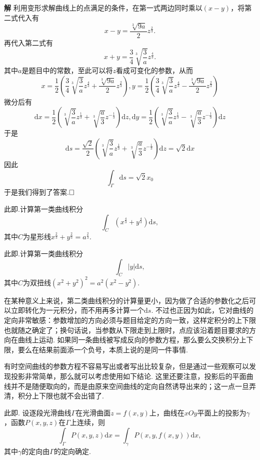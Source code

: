 \documentclass{ctexart}
\newenvironment{custom}[1]{\par\noindent \textbf{#1}\quad}{\par\vspace{1em}}
\begin{document}
\begin{custom}{解}
利用变形求解曲线上的点满足的条件，在第一式两边同时乘以$(x-y)$，将第二式代入有
$$x-y=\frac{\sqrt[3]{9a}}{2}z^{\frac{2}{3}}.$$
再代入第二式有
$$x+y=\frac{3}{4}\sqrt[3]{\frac{3}{a}}z^{\frac{4}{3}}.$$
其中$a$是题目中的常数，至此可以将$z$看成可变化的参数，从而
$$x=\frac{1}{2}\left(\frac{3}{4}\sqrt[3]{\frac{3}{a}}z^{\frac{4}{3}}+\frac{\sqrt[3]{9a}}{2}z^{\frac{2}{3}}\right),y=\frac{1}{2}\left(\frac{3}{4}\sqrt[3]{\frac{3}{a}}z^{\frac{4}{3}}-\frac{\sqrt[3]{9a}}{2}z^{\frac{2}{3}}\right)$$
微分后有
$$\mathrm{d}x=\frac{1}{2}\left(\sqrt[3]{\frac{3}{a}}z^{\frac{1}{3}}+\sqrt[3]{\frac{a}{3}}z^{-\frac{1}{3}}\right)\mathrm{d}z,\mathrm{d}y=\frac{1}{2}\left(\sqrt[3]{\frac{3}{a}}z^{\frac{1}{3}}-\sqrt[3]{\frac{a}{3}}z^{-\frac{1}{3}}\right)\mathrm{d}z$$
于是
$$\mathrm{d}s=\frac{\sqrt{2}}{2}\left(\sqrt[3]{\frac{3}{a}}z^{\frac{1}{3}}+\sqrt[3]{\frac{a}{3}}z^{-\frac{1}{3}}\right)\mathrm{d}z=\sqrt{2}\mathrm{d}x$$
因此
$$\int_{\Gamma}{\mathrm{d}s}=\sqrt{2}x_{0}$$
于是我们得到了答案.$\hfill{\square}$
\end{custom}

\begin{exercise}
此即\cite[24.1.3练习题1(1)]{XHM}.计算第一类曲线积分
$$\int_{C}{(x^{\frac{4}{3}}+y^{\frac{4}{3}})\mathrm{d}s},$$
其中$C$为星形线$x^{\frac{2}{3}}+y^{\frac{2}{3}}=a^{\frac{2}{3}}$.
\end{exercise}

\begin{exercise}
此即\cite[24.1.3练习题1(3)]{XHM}.计算第一类曲线积分
$$\int_{C}{|y|\mathrm{d}s},$$
其中$C$为双扭线$(x^{2}+y^{2})^{2}=a^{2}(x^{2}-y^{2})$.
\end{exercise}


在某种意义上来说，第二类曲线积分的计算量更小，因为做了合适的参数化之后可以立即转化为一元积分，而不用再多计算一个$\mathrm{d}s$. 不过也正因为如此，它对曲线的定向非常敏感：参数增加的方向必须与题目给定的方向一致，这样定积分的上下限也就随之确定了；换句话说，当参数从下限走到上限时，点应该沿着题目要求的方向在曲线上运动. 如果同一条曲线被写成反向的参数方程，那么要么交换积分上下限，要么在结果前面添一个负号，本质上说的是同一件事情.

有时空间曲线的参数方程不容易写出或者写出比较复杂，但是通过一些观察可以发现投影非常简单，那么就可以考虑使用如下结论. 这里还要注意，投影后的平面曲线并不是随便取向的，而是由原来空间曲线的定向自然诱导出来的；这一点一旦弄清，积分上下限也就不会出错了.

\begin{theorem}
此即\cite[命题24.2.1]{XHM}. 设逐段光滑曲线$\Gamma$在光滑曲面$z=f(x,y)$上，曲线在$xOy$平面上的投影为$\gamma$，函数$P(x,y,z)$在$\Gamma$上连续，则
$$\int_{\Gamma}{P(x,y,z)\mathrm{d}x}=\int_{\gamma}{P(x,y,f(x,y))\mathrm{d}x},$$
其中$\gamma$的定向由$\Gamma$的定向确定.
\end{theorem}
\end{document}
